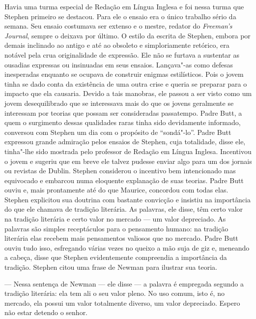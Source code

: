 Havia uma turma especial de Redação em Língua Inglesa e foi nessa
turma que Stephen primeiro se destacou.  Para ele o ensaio era o único
trabalho sério da semana.  Seu ensaio costumava ser extenso e o mestre,
redator do \textit{Freeman’s Journal}, sempre o deixava por último.  O
estilo da escrita de Stephen, embora por demais inclinado ao
antigo e até ao obsoleto e simploriamente retórico, era notável pela
crua originalidade de expressão.  Ele não se furtava a sustentar as
ousadias expressas ou insinuadas em seus ensaios.  Lançava"-as como
defesas inesperadas enquanto se ocupava de construir enigmas
estilísticos.  Pois o jovem tinha se dado conta da existência de uma
outra crise e queria se preparar para o impacto que ela causaria.
Devido a tais manobras, ele passou a ser visto como um jovem
desequilibrado que se interessava mais do que os jovens geralmente se
interessam por teorias que possam ser consideradas passatempo.  Padre
Butt, a quem o surgimento dessas qualidades raras tinha sido
devidamente informado, conversou com Stephen um dia com o propósito de
“sondá"-lo”.  Padre Butt expressou grande admiração pelos ensaios de
Stephen, cuja totalidade, disse ele, tinha"-lhe sido mostrada pelo
professor de Redação em Língua Inglesa.  Incentivou o jovem e sugeriu
que em breve ele talvez pudesse enviar algo para um dos jornais ou
revistas de Dublin.  Stephen considerou o incentivo bem intencionado
mas equivocado e embarcou numa eloquente explanação de suas teorias.
Padre Butt ouviu e, mais prontamente até do que Maurice,
concordou com todas elas.  Stephen explicitou sua doutrina com bastante
convicção e insistiu na importância do que ele chamava de tradição
literária.  \label{as"-palavras} As palavras, ele disse, têm certo valor na tradição
literária e certo valor no mercado --- um valor depreciado.  As palavras
são simples receptáculos para o pensamento humano: na tradição
literária elas recebem mais pensamentos valiosos que no mercado.  Padre
Butt ouviu tudo isso, esfregando várias vezes no queixo a mão suja de
giz e, \label{meneando"-a} meneando a cabeça, disse que Stephen evidentemente compreendia a
importância da tradição.  Stephen citou uma frase de Newman para
ilustrar sua teoria.

--- Nessa sentença de Newman --- ele disse --- a palavra é
empregada segundo a tradição literária: ela tem ali o seu valor pleno.
No uso comum, isto é, no mercado, ela possui um valor totalmente
diverso, um valor depreciado.  Espero não estar detendo o senhor.

